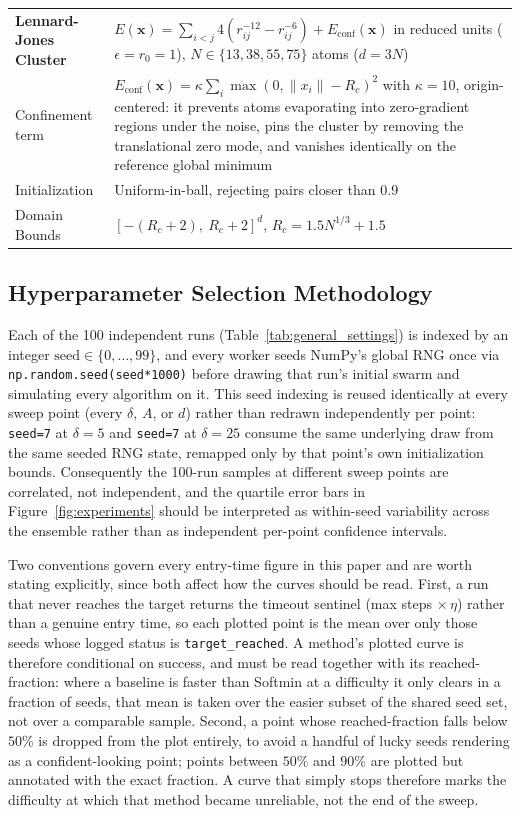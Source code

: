 \documentclass{opt2026} %
\newcommand{\xx}{\mathbf{x}}
\begin{document}
\begin{table}[!htbp]
\begin{tabular}{@{}lp{}@{}}
\midrule
\textbf{Lennard-Jones Cluster} & $E(\xx) = \sum_{i<j} 4(r_{ij}^{-12} - r_{ij}^{-6}) + E_{\text{conf}}(\xx)$ in reduced units ($\epsilon=r_0=1$), $N \in \{13, 38, 55, 75\}$ atoms ($d=3N$) \\
Confinement term & $E_{\text{conf}}(\xx) = \kappa\sum_i \max(0,\|x_i\|-R_c)^2$ with $\kappa=10$, origin-centered: it prevents atoms evaporating into zero-gradient regions under the noise, pins the cluster by removing the translational zero mode, and vanishes identically on the reference global minimum \\
Initialization & Uniform-in-ball, rejecting pairs closer than 0.9 \\
Domain Bounds & $[-(R_c+2),\ R_c+2]^d$, $R_c = 1.5 N^{1/3} + 1.5$ \\
\bottomrule
\end{tabular}
\end{table}

\subsection{Hyperparameter Selection Methodology}
\label{app:hyperparameter-methodology}

Each of the 100 independent runs (Table~\ref{tab:general_settings}) is indexed by an integer $\text{seed}\in\{0,\dots,99\}$, and every worker seeds NumPy's global RNG once via \texttt{np.random.seed(seed*1000)} before drawing that run's initial swarm and simulating every algorithm on it. This seed indexing is reused identically at every sweep point (every $\delta$, $A$, or $d$) rather than redrawn independently per point: \texttt{seed=7} at $\delta=5$ and \texttt{seed=7} at $\delta=25$ consume the same underlying draw from the same seeded RNG state, remapped only by that point's own initialization bounds. Consequently the 100-run samples at different sweep points are correlated, not independent, and the quartile error bars in Figure~\ref{fig:experiments} should be interpreted as within-seed variability across the ensemble rather than as independent per-point confidence intervals.

Two conventions govern every entry-time figure in this paper and are worth stating explicitly, since both affect how the curves should be read. First, a run that never reaches the target returns the timeout sentinel (max steps $\times\,\eta$) rather than a genuine entry time, so each plotted point is the mean over only those seeds whose logged status is \texttt{target\_reached}. A method's plotted curve is therefore conditional on success, and must be read together with its reached-fraction: where a baseline is faster than Softmin at a difficulty it only clears in a fraction of seeds, that mean is taken over the easier subset of the shared seed set, not over a comparable sample. Second, a point whose reached-fraction falls below $50\%$ is dropped from the plot entirely, to avoid a handful of lucky seeds rendering as a confident-looking point; points between $50\%$ and $90\%$ are plotted but annotated with the exact fraction. A curve that simply stops therefore marks the difficulty at which that method became unreliable, not the end of the sweep.
\end{document}
